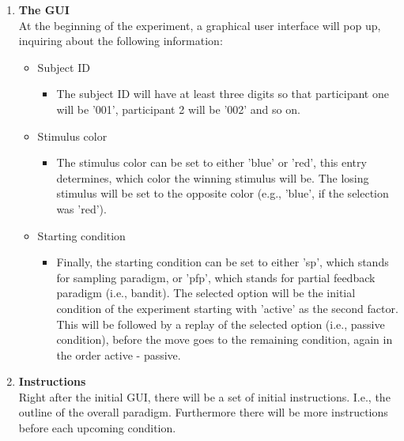 \documentclass[
	12pt,
	oneside,
	bibliography=totocnumbered]{scrartcl}
\begin{document}
\begin{enumerate}

\item \textbf{The GUI} \\
At the beginning of the experiment, a graphical user interface will pop up, inquiring about the following information:
\begin{itemize}
\item Subject ID
\begin{itemize}
\item The subject ID will have at least three digits so that participant one will be '001', participant 2 will be '002' and so on.
\end{itemize}
\item Stimulus color
\begin{itemize}
\item The stimulus color can be set to either 'blue' or 'red', this entry determines, which color the winning stimulus will be. The losing stimulus will be set to the opposite color (e.g., 'blue', if the selection was 'red').
\end{itemize}
\item Starting condition
\begin{itemize}
\item  Finally, the starting condition can be set to either 'sp', which stands for sampling paradigm, or 'pfp', which stands for partial feedback paradigm (i.e., bandit). The selected option will be the initial condition of the experiment starting with 'active' as the second factor. This will be followed by a replay of the selected option (i.e., passive condition), before the move goes to the remaining condition, again in the order active - passive.
\end{itemize}
\end{itemize}


\item \textbf{Instructions} \\
Right after the initial GUI, there will be a set of initial instructions. I.e., the outline of the overall paradigm. Furthermore there will be more instructions before each upcoming condition.



\end{enumerate}
\end{document}

